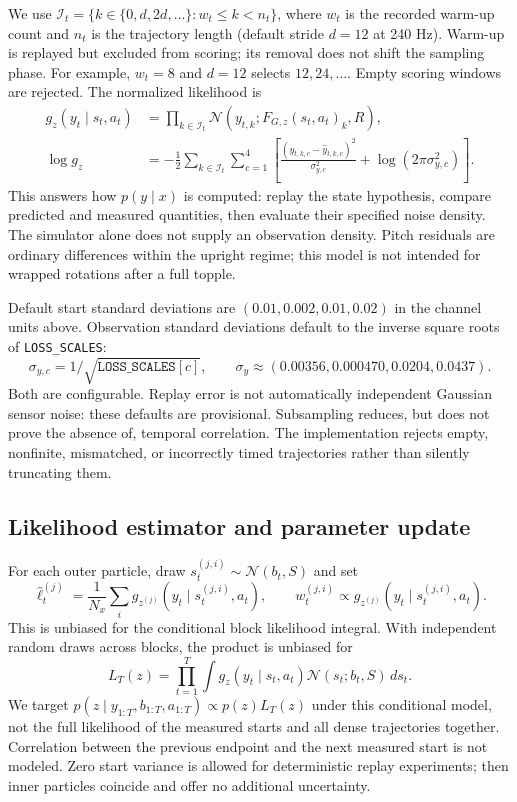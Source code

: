 \documentclass[11pt]{article}
\begin{document}
We use $\mathcal I_t=\{k\in\{0,d,2d,\ldots\}:w_t\leq k<n_t\}$,
where $w_t$ is the recorded warm-up count and $n_t$ is the trajectory length
(default stride $d=12$ at 240 Hz). Warm-up is replayed but excluded from
scoring; its removal does not shift the sampling phase. For example,
$w_t=8$ and $d=12$ selects $12,24,\ldots$. Empty scoring windows are rejected.
The normalized likelihood is
\begin{align}
 g_z(y_t\mid s_t,a_t)&=\prod_{k\in\mathcal I_t}
 \mathcal N(y_{t,k};F_{G,z}(s_t,a_t)_k,R),\\
 \log g_z&=-\frac12\sum_{k\in\mathcal I_t}\sum_{c=1}^4
 \left[\frac{(y_{t,k,c}-\widehat y_{t,k,c})^2}{\sigma_{y,c}^2}
 +\log(2\pi\sigma_{y,c}^2)\right].
\end{align}
This answers how $p(y\mid x)$ is computed: replay the state hypothesis,
compare predicted and measured quantities, then evaluate their specified
noise density. The simulator alone does not supply an observation density.
Pitch residuals are ordinary differences within the upright regime;
this model is not intended for wrapped rotations after a full topple.

Default start standard deviations are
$(0.01,0.002,0.01,0.02)$ in the channel units above. Observation standard
deviations default to the inverse square roots of \texttt{LOSS\_SCALES}:
\begin{equation}
 \sigma_{y,c}=1/\sqrt{\texttt{LOSS\_SCALES}[c]},\qquad
 \sigma_y\approx(0.00356,0.000470,0.0204,0.0437).
\end{equation}
Both are configurable. Replay error is not automatically independent
Gaussian sensor noise: these defaults are provisional. Subsampling
reduces, but does not prove the absence of, temporal correlation.
The implementation rejects empty, nonfinite, mismatched, or incorrectly
timed trajectories rather than silently truncating them.

\subsection{Likelihood estimator and parameter update}
For each outer particle, draw $s_t^{(j,i)}\sim\mathcal N(b_t,S)$ and set
\begin{equation}
 \widehat\ell_t^{(j)}=\frac1{N_x}\sum_i
 g_{z^{(j)}}(y_t\mid s_t^{(j,i)},a_t),\qquad
 w_t^{(j,i)}\propto g_{z^{(j)}}(y_t\mid s_t^{(j,i)},a_t).
\end{equation}
This is unbiased for the conditional block likelihood integral. With
independent random draws across blocks, the product is unbiased for
\begin{equation}
 L_T(z)=\prod_{t=1}^T\int g_z(y_t\mid s_t,a_t)
 \mathcal N(s_t;b_t,S)\,ds_t.
\end{equation}
We target $p(z\mid y_{1:T},b_{1:T},a_{1:T})\propto p(z)L_T(z)$
under this conditional model, not the full likelihood of the measured
starts and all dense trajectories together. Correlation between the
previous endpoint and the next measured start is not modeled.
Zero start variance is allowed for deterministic replay experiments;
then inner particles coincide and offer no additional uncertainty.
\end{document}
